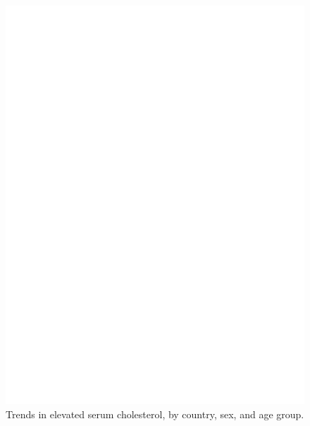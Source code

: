 \documentclass[12pt]{article}
\begin{document}
\begin{figure}[hp]
    \centering
    \includegraphics[width=\textwidth]{../3_figures/fig2_elevated.pdf}
    \caption{Trends in elevated serum cholesterol, by country, sex, and age group.}
    \label{fig:elevated}
\end{figure}
\end{document}
